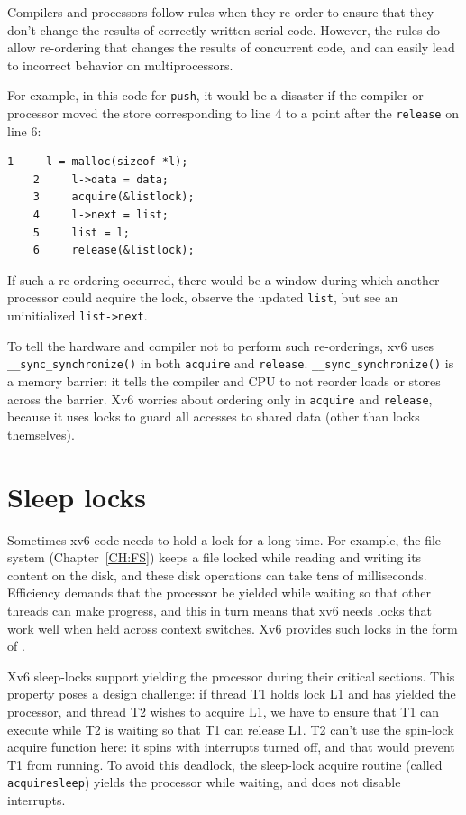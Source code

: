 Compilers and processors follow rules when they re-order to
ensure that they don't change the results of correctly-written
serial code.
However, the rules do allow re-ordering that
changes the results of concurrent code,
and can easily lead to incorrect behavior on multiprocessors.

For example, in this code for
\lstinline{push},
it would be a disaster if the compiler or processor moved the
store corresponding to
line 4 to a point after the
\lstinline{release}
on line 6:
\begin{lstlisting}[]
    1	  l = malloc(sizeof *l);
    2	  l->data = data;
    3	  acquire(&listlock);
    4	  l->next = list;
    5	  list = l;
    6	  release(&listlock);
\end{lstlisting}
If such a re-ordering occurred, there would be a window during
which another processor could acquire the lock,
observe the updated
\lstinline{list},
but see an uninitialized
\lstinline{list->next}.

To tell the hardware and compiler not to perform such re-orderings,
xv6 uses
\lstinline{__sync_synchronize()} 
in both
\lstinline{acquire}
and
\lstinline{release}.
\lstinline{__sync_synchronize()}
is a memory barrier:
it tells the compiler and CPU to not reorder loads or stores across the
barrier.
Xv6 worries about ordering only in
\lstinline{acquire}
and
\lstinline{release},
because it uses locks to guard all accesses to shared data (other than locks
themselves).
\section{Sleep locks}

Sometimes xv6 code needs to hold a lock for a long time. For example,
the file system (Chapter~\ref{CH:FS}) keeps a file locked while reading
and writing its content on the disk, and these disk operations can
take tens of milliseconds. Efficiency demands that the processor be
yielded while waiting so that other threads can make
progress, and this in turn means that xv6 needs locks that 
work well when held across context switches.
Xv6 provides such locks in the form of
.

Xv6 sleep-locks support yielding the processor during their critical
sections. This property poses a design challenge: if thread T1 holds
lock L1 and has yielded the processor, and thread T2 wishes to acquire
L1, we have to ensure that T1 can execute while T2 is waiting so
that T1 can release L1. T2 can't use the spin-lock acquire
function here: it
spins with interrupts turned off, and that would prevent T1
from running. To avoid this deadlock, the sleep-lock acquire
routine
(called
\lstinline{acquiresleep})
yields the processor while waiting, and does not disable
interrupts.

